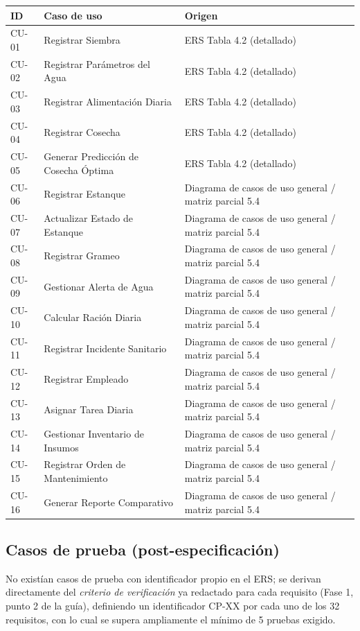 \documentclass[11pt,a4paper]{article}
\begin{document}
\begin{longtable}{|p{2cm}|p{7cm}|p{6.3cm}|}
\hline
\textbf{ID} & \textbf{Caso de uso} & \textbf{Origen} \\ \hline
\endhead
CU-01 & Registrar Siembra & ERS Tabla 4.2 (detallado) \\ \hline
CU-02 & Registrar Parámetros del Agua & ERS Tabla 4.2 (detallado) \\ \hline
CU-03 & Registrar Alimentación Diaria & ERS Tabla 4.2 (detallado) \\ \hline
CU-04 & Registrar Cosecha & ERS Tabla 4.2 (detallado) \\ \hline
CU-05 & Generar Predicción de Cosecha Óptima & ERS Tabla 4.2 (detallado) \\ \hline
CU-06 & Registrar Estanque & Diagrama de casos de uso general / matriz parcial 5.4 \\ \hline
CU-07 & Actualizar Estado de Estanque & Diagrama de casos de uso general / matriz parcial 5.4 \\ \hline
CU-08 & Registrar Grameo & Diagrama de casos de uso general / matriz parcial 5.4 \\ \hline
CU-09 & Gestionar Alerta de Agua & Diagrama de casos de uso general / matriz parcial 5.4 \\ \hline
CU-10 & Calcular Ración Diaria & Diagrama de casos de uso general / matriz parcial 5.4 \\ \hline
CU-11 & Registrar Incidente Sanitario & Diagrama de casos de uso general / matriz parcial 5.4 \\ \hline
CU-12 & Registrar Empleado & Diagrama de casos de uso general / matriz parcial 5.4 \\ \hline
CU-13 & Asignar Tarea Diaria & Diagrama de casos de uso general / matriz parcial 5.4 \\ \hline
CU-14 & Gestionar Inventario de Insumos & Diagrama de casos de uso general / matriz parcial 5.4 \\ \hline
CU-15 & Registrar Orden de Mantenimiento & Diagrama de casos de uso general / matriz parcial 5.4 \\ \hline
CU-16 & Generar Reporte Comparativo & Diagrama de casos de uso general / matriz parcial 5.4 \\ \hline
\end{longtable}

\subsection{Casos de prueba (post-especificación)}
No existían casos de prueba con identificador propio en el ERS; se derivan directamente del \emph{criterio de verificación} ya redactado para cada requisito (Fase 1, punto 2 de la guía), definiendo un identificador CP-XX por cada uno de los 32 requisitos, con lo cual se supera ampliamente el mínimo de 5 pruebas exigido.
\end{document}
